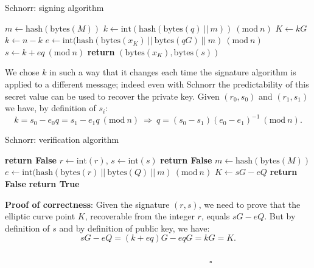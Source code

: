 \begin{algorithm}
	\caption{Schnorr: signing algorithm}
	\label{alg:schnorr_sig}
	\begin{algorithmic}[1]
		\State $m \gets \text{hash}(\text{bytes}(M))$
		\State $k \gets \text{int}(\text{hash}(\text{bytes}(q) \ || \ m)) \ (\text{mod} \ n)$
		\State $K \gets kG$
		\State $k \gets n - k$
		\EndIf
		\State $e \gets \text{int}(\text{hash}(\text{bytes}(x_K) \ || \ \text{bytes}(qG) \ || \ m) \ (\text{mod} \ n)$
		\State $s \gets k + eq \ (\text{mod} \ n)$
		\State \textbf{return} $(\text{bytes}(x_K), \text{bytes}(s))$
		\EndProcedure
	\end{algorithmic}
\end{algorithm}

\noindent
We chose $k$ in such a way that it changes each time the signature algorithm is applied to a different message; indeed even with Schnorr the predictability of this secret value can be used to recover the private key. Given $(r_0, s_0)$ and $(r_1, s_1)$ we have, by definition of $s_i$:
$$k = s_0 - e_0q = s_1 - e_1q\ (\text{mod} \ n) \ \Longrightarrow \ q = (s_0 - s_1)(e_0 - e_1)^{-1} \ (\text{mod} \ n).$$

\bigskip

\begin{algorithm}
	\caption{Schnorr: verification algorithm}
	\label{alg:schnorr_ver}
	\begin{algorithmic}[1]
		\State \textbf{return False}
		\EndIf 
		\State $r \gets \text{int}(r)$, $s \gets \text{int}(s)$
		\State \textbf{return False}
		\EndIf
		\State $m \gets \text{hash}(\text{bytes}(M))$
		\State $e \gets \text{int}(\text{hash}(\text{bytes}(r) \ || \ \text{bytes}(Q) \ || \ m) \ (\text{mod} \ n)$
		\State $K \gets sG - eQ$
		\State \textbf{return False} 
		\EndIf
		\State \textbf{return True}
		\EndProcedure	
	\end{algorithmic}
\end{algorithm}

\bigskip
\noindent
{\bf Proof of correctness}: Given the signature $(r, s)$, we need to prove that the elliptic curve point $K$, recoverable from the integer $r$, equals $sG - eQ$. But by definition of $s$ and by definition of public key, we have:
$$sG - eQ = (k + eq)G - eqG = kG = K.$$ 
\ \ \ \ \ \ \ \ \ \ \ \ \ \ \ \ \ \ \ \ \ \ \ \ \ \ \ \ \ \ \ \ \ \ \ \ \ \ \ \ \ \ \ \ \ \ \ \ \ \ \ \ \ \ \ \ \ \ \ \ \ \ \ \ \ \ \ \ \ \ \ \ \ \ \ \ \ \ \ \ \ \ \ \ \ \ \ \ \ \ \ \ \ \ \ \ \ \ \ \ \ \ \ \ \ \ \ \ \ \ \ \ \ \ \ \ \ \ \ \ $\square$

